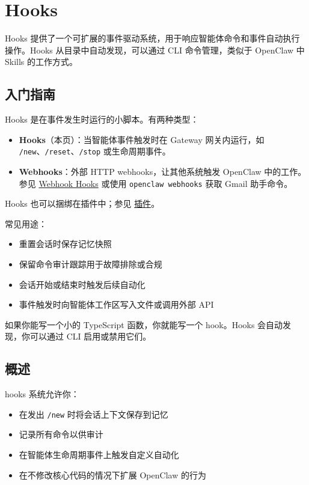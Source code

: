 \clearpage

\section{Hooks}


Hooks 提供了一个可扩展的事件驱动系统，用于响应智能体命令和事件自动执行操作。Hooks 从目录中自动发现，可以通过 CLI 命令管理，类似于 OpenClaw 中 Skills 的工作方式。

\subsection{入门指南}


Hooks 是在事件发生时运行的小脚本。有两种类型：

\begin{itemize}
  \item \textbf{Hooks}（本页）：当智能体事件触发时在 Gateway 网关内运行，如 \texttt{/new}、\texttt{/reset}、\texttt{/stop} 或生命周期事件。
  \item \textbf{Webhooks}：外部 HTTP webhooks，让其他系统触发 OpenClaw 中的工作。参见 \href{/automation/webhook}{Webhook Hooks} 或使用 \texttt{openclaw webhooks} 获取 Gmail 助手命令。
\end{itemize}


Hooks 也可以捆绑在插件中；参见 \href{/tools/plugin\#plugin-hooks}{插件}。

常见用途：

\begin{itemize}
  \item 重置会话时保存记忆快照
  \item 保留命令审计跟踪用于故障排除或合规
  \item 会话开始或结束时触发后续自动化
  \item 事件触发时向智能体工作区写入文件或调用外部 API
\end{itemize}


如果你能写一个小的 TypeScript 函数，你就能写一个 hook。Hooks 会自动发现，你可以通过 CLI 启用或禁用它们。

\subsection{概述}


hooks 系统允许你：

\begin{itemize}
  \item 在发出 \texttt{/new} 时将会话上下文保存到记忆
  \item 记录所有命令以供审计
  \item 在智能体生命周期事件上触发自定义自动化
  \item 在不修改核心代码的情况下扩展 OpenClaw 的行为
\end{itemize}


